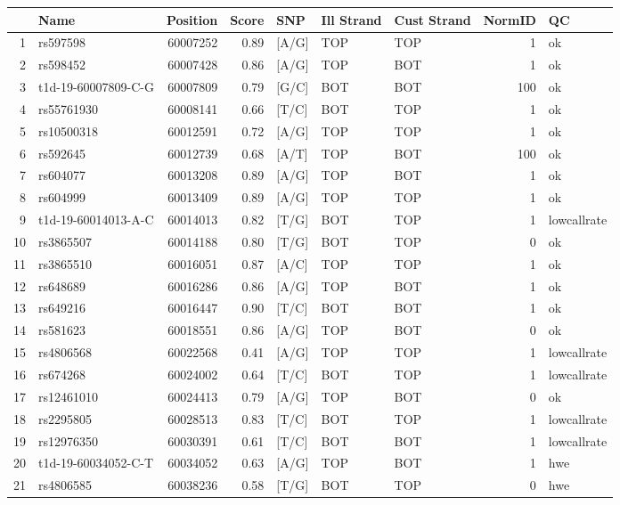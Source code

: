 \documentclass[12pt,a4paper,twoside]{article}
\begin{document}
\begin{table}[h]
\begin{center}
\footnotesize
\begin{tabular}{rlrrlllrl}
  \hline
 & Name & Position & Score & SNP & Ill Strand & Cust Strand & NormID & QC \\ 
  \hline
1 & rs597598 & 60007252 & 0.89 & [A/G] & TOP & TOP &   1 & ok \\ 
  2 & rs598452 & 60007428 & 0.86 & [A/G] & TOP & BOT &   1 & ok \\ 
  3 & t1d-19-60007809-C-G & 60007809 & 0.79 & [G/C] & BOT & BOT & 100 & ok \\ 
  4 & rs55761930 & 60008141 & 0.66 & [T/C] & BOT & TOP &   1 & ok \\ 
  5 & rs10500318 & 60012591 & 0.72 & [A/G] & TOP & TOP &   1 & ok \\ 
  6 & rs592645 & 60012739 & 0.68 & [A/T] & TOP & BOT & 100 & ok \\ 
  7 & rs604077 & 60013208 & 0.89 & [A/G] & TOP & BOT &   1 & ok \\ 
  8 & rs604999 & 60013409 & 0.89 & [A/G] & TOP & TOP &   1 & ok \\ 
  9 & t1d-19-60014013-A-C & 60014013 & 0.82 & [T/G] & BOT & TOP &   1 & lowcallrate \\ 
  10 & rs3865507 & 60014188 & 0.80 & [T/G] & BOT & TOP &   0 & ok \\ 
  11 & rs3865510 & 60016051 & 0.87 & [A/C] & TOP & TOP &   1 & ok \\ 
  12 & rs648689 & 60016286 & 0.86 & [A/G] & TOP & BOT &   1 & ok \\ 
  13 & rs649216 & 60016447 & 0.90 & [T/C] & BOT & BOT &   1 & ok \\ 
  14 & rs581623 & 60018551 & 0.86 & [A/G] & TOP & BOT &   0 & ok \\ 
  15 & rs4806568 & 60022568 & 0.41 & [A/G] & TOP & TOP &   1 & lowcallrate \\ 
  16 & rs674268 & 60024002 & 0.64 & [T/C] & BOT & TOP &   1 & lowcallrate \\ 
  17 & rs12461010 & 60024413 & 0.79 & [A/G] & TOP & BOT &   0 & ok \\ 
  18 & rs2295805 & 60028513 & 0.83 & [T/C] & BOT & TOP &   1 & lowcallrate \\ 
  19 & rs12976350 & 60030391 & 0.61 & [T/C] & BOT & BOT &   1 & lowcallrate \\ 
  20 & t1d-19-60034052-C-T & 60034052 & 0.63 & [A/G] & TOP & BOT &   1 & hwe \\ 
  21 & rs4806585 & 60038236 & 0.58 & [T/G] & BOT & TOP &   0 & hwe \\ 

\end{tabular}
\end{center}
\end{table}
\end{document}
